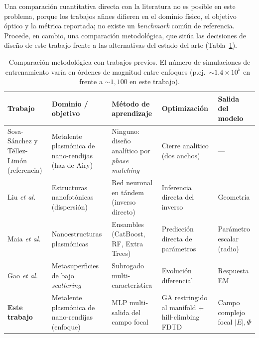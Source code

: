 Una comparación cuantitativa directa con la literatura no es posible en este problema, porque los trabajos afines difieren en el dominio físico, el objetivo óptico y la métrica reportada; no existe un \textit{benchmark} común de referencia. Procede, en cambio, una comparación metodológica, que sitúa las decisiones de diseño de este trabajo frente a las alternativas del estado del arte (Tabla~\ref{tab:comparacion}).

\begin{table}[H]
\centering
\footnotesize
\begin{tabular}{@{}>{\raggedright\arraybackslash}p{}
                  >{\raggedright\arraybackslash}p{}
                  >{\raggedright\arraybackslash}p{}
                  >{\raggedright\arraybackslash}p{}
                  >{\raggedright\arraybackslash}p{}@{}}
\toprule
\textbf{Trabajo} & \textbf{Dominio / objetivo} & \textbf{Método de aprendizaje} & \textbf{Optimización} & \textbf{Salida del modelo} \\
\midrule
Sosa-Sánchez y Téllez-Limón~\cite{airy_metalens} (referencia) & Metalente plasmónica de nano-rendijas (haz de Airy) & Ninguno: diseño analítico por \textit{phase matching} & Cierre analítico (dos anchos) & --- \\
\addlinespace
Liu \textit{et al.}~\cite{liu2018tandem} & Estructuras nanofotónicas (dispersión) & Red neuronal en tándem (inverso directo) & Inferencia directa del inverso & Geometría \\
\addlinespace
Maia \textit{et al.}~\cite{maia2025inverse} & Nanoestructuras plasmónicas & Ensambles (CatBoost, RF, Extra Trees) & Predicción directa de parámetros & Parámetro escalar (radio) \\
\addlinespace
Gao \textit{et al.}~\cite{gao2025surrogate} & Metasuperficies de bajo \textit{scattering} & Subrogado multi-característica & Evolución diferencial & Respuesta EM \\
\addlinespace
\textbf{Este trabajo} & Metalente plasmónica de nano-rendijas (enfoque) & MLP multi-salida del campo focal & GA restringido al manifold + hill-climbing FDTD & Campo complejo focal $|E|,\Phi$ \\
\bottomrule
\end{tabular}
\caption{Comparación metodológica con trabajos previos. El número de simulaciones de
entrenamiento varía en órdenes de magnitud entre enfoques (p.ej.\ ${\sim}1.4\times10^{5}$
en~\cite{maia2025inverse} frente a ${\sim}1{,}100$ en este trabajo).}
\label{tab:comparacion}
\end{table}

